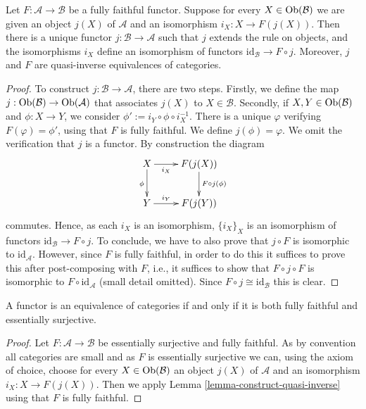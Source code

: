\begin{lemma}
\label{lemma-construct-quasi-inverse}
Let $F : \mathcal{A} \to \mathcal{B}$ be a fully faithful functor.
Suppose for every $X \in \mathop{\mathrm{Ob}}\nolimits(\mathcal{B})$ we are given an
object $j(X)$ of $\mathcal{A}$ and an isomorphism $i_X : X \to F(j(X))$.
Then there is a unique functor $j : \mathcal{B} \to \mathcal{A}$
such that $j$ extends the rule on objects, and the isomorphisms
$i_X$ define an isomorphism of functors
$\text{id}_\mathcal{B} \to F \circ j$. Moreover, $j$ and $F$
are quasi-inverse equivalences of categories.
\end{lemma}

\begin{proof}
To construct $j : \mathcal{B} \to \mathcal{A}$, there are two steps. Firstly,
we define the map $j : \mathop{\mathrm{Ob}}\nolimits(\mathcal{B}) \to \mathop{\mathrm{Ob}}\nolimits(\mathcal{A})$ that associates
$j(X)$ to $X \in \mathcal{B}$. Secondly, if $X,Y \in \mathop{\mathrm{Ob}}\nolimits(\mathcal{B})$ and
$\phi : X \to Y$, we consider $\phi' := i_Y \circ\phi\circ i_X^{-1}$. There is
a unique $\varphi$ verifying $F(\varphi) = \phi'$, using that $F$ is fully
faithful. We define $j(\phi) = \varphi$. We omit the verification that $j$
is a functor. By construction the diagram
$$
\xymatrix{
X \ar[r]_-{i_X} \ar[d]_{\phi}
&
F(j(X)) \ar[d]^{F\circ j(\phi)}
\\
Y \ar[r]^-{i_Y}
&
F(j(Y))
}
$$
commutes. Hence, as each $i_X$ is an isomorphism, $\{i_X\}_X$ is an
isomorphism of functors $\text{id}_\mathcal{B} \to F\circ j$. To conclude, we
have to also prove that $j \circ F$ is isomorphic to $\text{id}_\mathcal{A}$.
However, since $F$ is fully faithful, in order to do this it suffices
to prove this after post-composing with $F$, i.e., it suffices to
show that $F \circ j \circ F$ is isomorphic to $F \circ \text{id}_\mathcal{A}$
(small detail omitted). Since $F \circ j \cong \text{id}_\mathcal{B}$
this is clear.
\end{proof}

\begin{lemma}
\label{lemma-equivalence-categories}
A functor is an equivalence of categories if and only if it is both fully
faithful and essentially surjective.
\end{lemma}

\begin{proof}
Let $F : \mathcal{A} \to \mathcal{B}$ be essentially surjective and fully
faithful. As by convention all categories are small and as $F$ is essentially
surjective we can, using the axiom of choice, choose for every
$X \in \mathop{\mathrm{Ob}}\nolimits(\mathcal{B})$ an object $j(X)$ of $\mathcal{A}$ and an
isomorphism $i_X : X \to F(j(X))$. Then we apply
Lemma \ref{lemma-construct-quasi-inverse}
using that $F$ is fully faithful.
\end{proof}

